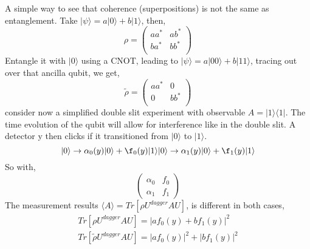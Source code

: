 \documentclass{article}
\begin{document}
A simple way to see that coherence (superpositions) is not the same as entanglement. 
Take $|\psi\rangle=a|0\rangle+b|1\rangle$, then,
\begin{equation}
    \rho=\begin{pmatrix}
        aa^* & ab^* \\
        ba^*& bb^* \\
    \end{pmatrix}
\end{equation}
Entangle it with $|0\rangle$ using a CNOT, leading to $|\psi\rangle=a|00\rangle+b|11\rangle$, tracing out over that ancilla qubit, we get,
\begin{equation}
    \tilde{\rho}=\begin{pmatrix}
        aa^* & 0\\
        0& bb^* \\
    \end{pmatrix}
\end{equation}
consider now a simplified double slit experiment with observable $A=|1\rangle\langle 1|$. 
The time evolution of the qubit will allow for interference like in the double slit. A detector y then clicks if it transitioned from $|0\rangle$ to $|1\rangle$.  
\begin{equation}
    |0\rangle\rightarrow \alpha_0(y)|0\rangle+\f_0(y)|1\rangle\\
    |0\rangle\rightarrow \alpha_1(y)|0\rangle+\f_1(y)|1\rangle
\end{equation}
So with,
\begin{equation}
    \begin{pmatrix}
        \alpha_0 & f_0\\
        \alpha_1 & f_1
    \end{pmatrix}
\end{equation}
The measurement results $\langle A\rangle=Tr[\rho U^{dagger}AU]$, is different in both cases,
\begin{eqnarray}
    Tr[\rho U^{dagger}AU] = |af_0(y)+bf_1(y)|^2\\
    Tr[\tilde{\rho} U^{dagger}AU] = |af_0(y)|^2+|bf_1(y)|^2
\end{eqnarray}

\begin{comment}   
Coherences: 
For,
\begin{align}
    |\psi\rangle =a|0\rangle+be^{i\theta}|1\rangle\\
    |\psi'\rangle =e^{i\phi}(a'|0\rangle+b'e^{i\theta'}|1\rangle)\\
\end{align}
in $|\psi\rangle$ there is perfect coherence between $|0\rangle$and $|1\rangle$ (for $\theta$ well defined). Defining $|\phi\rangle=|\psi\rangle+|\phi'\rangle$, with $\theta, \theta', \phi=0$ the probabilities add up classically. But with non-zero phases, they dont. Without coherence between states (ie non-zero controlled phase relations) we loose things like entanglement that make the probabilities non-classical.
\end{comment}
\end{document}

